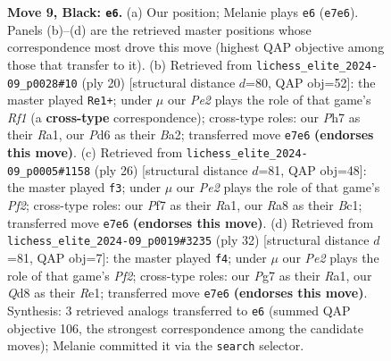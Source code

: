 \documentclass[11pt]{article}
\begin{document}
\begin{figure}[p]
\caption{\textbf{Move 9, Black: \texttt{e6}.} (a) Our position; Melanie plays \texttt{e6} (\texttt{e7e6}). Panels (b)--(d) are the retrieved master positions whose correspondence most drove this move (highest QAP objective among those that transfer to it). (b) Retrieved from \texttt{lichess\_elite\_2024-09\_p0028\#10} (ply 20) [structural distance $d$=80, QAP obj=52]: the master played \texttt{Re1+}; under $\mu$ our \emph{Pe2} plays the role of that game's \emph{Rf1} (a \textbf{cross-type} correspondence); cross-type roles: our \emph{P}h7 as their \emph{R}a1, our \emph{P}d6 as their \emph{B}a2; transferred move \texttt{e7e6} \textbf{(endorses this move)}. (c) Retrieved from \texttt{lichess\_elite\_2024-09\_p0005\#1158} (ply 26) [structural distance $d$=81, QAP obj=48]: the master played \texttt{f3}; under $\mu$ our \emph{Pe2} plays the role of that game's \emph{Pf2}; cross-type roles: our \emph{P}f7 as their \emph{R}a1, our \emph{R}a8 as their \emph{B}c1; transferred move \texttt{e7e6} \textbf{(endorses this move)}. (d) Retrieved from \texttt{lichess\_elite\_2024-09\_p0019\#3235} (ply 32) [structural distance $d$=81, QAP obj=7]: the master played \texttt{f4}; under $\mu$ our \emph{Pe2} plays the role of that game's \emph{Pf2}; cross-type roles: our \emph{P}g7 as their \emph{R}a1, our \emph{Q}d8 as their \emph{R}e1; transferred move \texttt{e7e6} \textbf{(endorses this move)}. Synthesis: 3 retrieved analogs transferred to \texttt{e6} (summed QAP objective 106, the strongest correspondence among the candidate moves); Melanie committed it via the \texttt{search} selector.}
\label{fig:thought-m17}
\end{figure}

\clearpage
\end{document}
